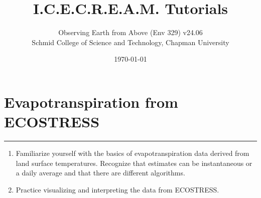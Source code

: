 \documentclass[oneside,a4paper,11pt,explicit]{book}
\title{I.C.E.C.R.E.A.M. Tutorials}
\subtitle{\small Observing Earth from Above (Env 329) v24.06 \\
	\small Schmid College of Science and Technology, Chapman University}
\date{\today}
\begin{document}
\dominitoc

\faketableofcontents

\setcounter{chapter}{7} %

\chapter{Evapotranspiration from ECOSTRESS} %

\vspace{-2em}

\minitoc

\hrule

\vspace{1em}

\begin{tcolorbox}[enhanced,frame style image=blueshade.png,
	opacityback=0.75,opacitybacktitle=0.25,
	colback=blue!5!white,colframe=blue!75!black,title={\Large \textbf{Objectives:}}]
	\large
	\begin{enumerate}
		\item Familiarize yourself with the basics of evapotranspiration data derived from land surface temperatures. Recognize that estimates can be instantaneous or a daily average and that there are different algorithms. 
		\item Practice visualizing and interpreting the data from ECOSTRESS. 
	\end{enumerate}
\end{tcolorbox}

\clearpage
\end{document}
